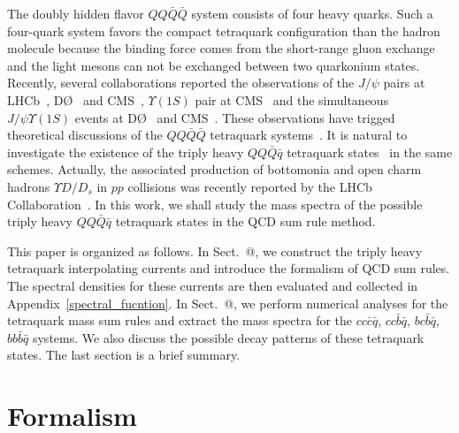 \documentclass[prd,showpacs,showkeys,floatfix,amsmath,amssymb,floatfix,english]{revtex4}
\makeatletter
\newcommand{\Rmnum}[1]{\expandafter\@slowromancap\romannumeral #1@}
\makeatother
\begin{document}
The doubly hidden flavor $QQ\bar Q\bar Q$ system consists of four
heavy quarks. Such a four-quark system favors the compact tetraquark
configuration than the hadron molecule because the binding force
comes from the short-range gluon exchange and the light mesons can
not be exchanged between two quarkonium states. Recently, several
collaborations reported the observations of the $J/\psi$ pairs at
LHCb~\cite{2012-Aaij-p52-59}, D\O~\cite{2014-Abazov-p111101-111101}
and CMS~\cite{2014-Khachatryan-p94-94}, $\Upsilon(1S)$ pair at
CMS~\cite{2017-Khachatryan-p13-13} and the simultaneous
$J/\psi\Upsilon(1S)$ events at D\O~\cite{2016-Abazov-p82002-82002}
and CMS~\cite{CMS1}. These observations have trigged theoretical
discussions of the $QQ\bar Q\bar Q$ tetraquark
systems~\cite{2016-Chen-p-,2016-Wu-p-,2017-Karliner-p34011-34011,2016-Bai-p-,2017-Wang-p-a}.
It is natural to investigate the existence of the triply heavy
$QQ\bar Q\bar q$ tetraquark states~\cite{2017-Chen-p5-5} in the same
schemes. Actually, the associated production of bottomonia and open
charm hadrons $\Upsilon D/D_s$ in $pp$ collisions was recently
reported by the LHCb Collaboration~\cite{2016-Aaij-p52-52}. In this
work, we shall study the mass spectra of the possible triply heavy
$QQ\bar Q\bar q$ tetraquark states in the QCD sum rule method.

This paper is organized as follows. In Sect.~\Rmnum{2}, we construct
the triply heavy tetraquark interpolating currents and introduce the
formalism of QCD sum rules. The spectral densities for these
currents are then evaluated and collected in
Appendix~\ref{spectral_fucntion}. In Sect.~\Rmnum{3}, we perform
numerical analyses for the tetraquark mass sum rules and extract the
mass spectra for the $cc\bar{c}\bar{q}$, $cc\bar{b}\bar{q}$,
$bc\bar{b}\bar{q}$, $bb\bar{b}\bar{q}$ systems. We also discuss the
possible decay patterns of these tetraquark states. The last section
is a brief summary.


\section{Formalism}
\label{sec2}
\end{document}
